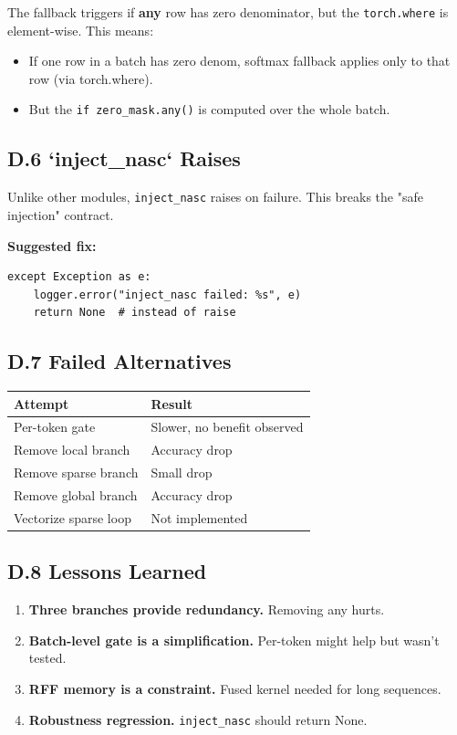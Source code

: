 The fallback triggers if \textbf{any} row has zero denominator, but the 
\texttt{torch.where} is element-wise. This means:
\begin{itemize}
\item If one row in a batch has zero denom, softmax fallback applies only to
  that row (via torch.where).
\item But the \texttt{if zero\_mask.any()} is computed over the whole batch.

\end{itemize}
\subsection{D.6 `inject\_nasc` Raises}

Unlike other modules, \texttt{inject\_nasc} raises on failure. This breaks the 
"safe injection" contract.

\textbf{Suggested fix:}

\begin{lstlisting}
except Exception as e:
    logger.error("inject_nasc failed: %s", e)
    return None  # instead of raise
\end{lstlisting}

\subsection{D.7 Failed Alternatives}

\begin{table}[H]
\centering
\small
\begin{tabular}{ll}
\toprule
\textbf{Attempt} & \textbf{Result} \\
\midrule
Per-token gate & Slower, no benefit observed \\
Remove local branch & Accuracy drop \\
Remove sparse branch & Small drop \\
Remove global branch & Accuracy drop \\
Vectorize sparse loop & Not implemented \\
\bottomrule
\end{tabular}
\end{table}

\subsection{D.8 Lessons Learned}

\begin{enumerate}
\item \textbf{Three branches provide redundancy.} Removing any hurts.
\item \textbf{Batch-level gate is a simplification.} Per-token might help but
  wasn't tested.
\item \textbf{RFF memory is a constraint.} Fused kernel needed for long sequences.
\item \textbf{Robustness regression.} \texttt{inject\_nasc} should return None.

\end{enumerate}
